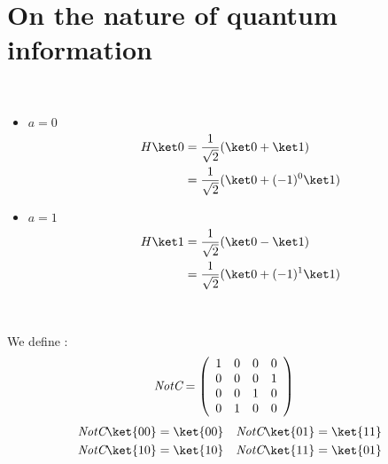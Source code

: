 \section{On the nature of quantum information}

\exo[Hadamard]~

\begin{itemize}
  \item $a = 0$
    \begin{align*}
      H \ket 0 &= \frac 1 {\sqrt 2}(\ket 0 + \ket 1)\\
      &= \frac 1 {\sqrt 2}(\ket 0 + (-1)^0 \ket 1)
    \end{align*}
  \item $a = 1$
    \begin{align*}
      H \ket 1 &= \frac 1 {\sqrt 2}(\ket 0 - \ket 1)\\
      &= \frac 1 {\sqrt 2}(\ket 0 + (-1)^1 \ket 1)
    \end{align*}
\end{itemize}

~

We define :
\begin{align*}
\textit{NotC} &=
\left(\begin{array}{c c c c}
  1 & 0 & 0 & 0\\
  0 & 0 & 0 & 1\\
  0 & 0 & 1 & 0\\
  0 & 1 & 0 & 0
\end{array}\right)
\end{align*}
\begin{align*}
\textit{NotC}\ket{00} &= \ket{00}&
\textit{NotC}\ket{01} &= \ket{11} \\
\textit{NotC}\ket{10} &= \ket{10}&
\textit{NotC}\ket{11} &= \ket{01} \\
\end{align*}

